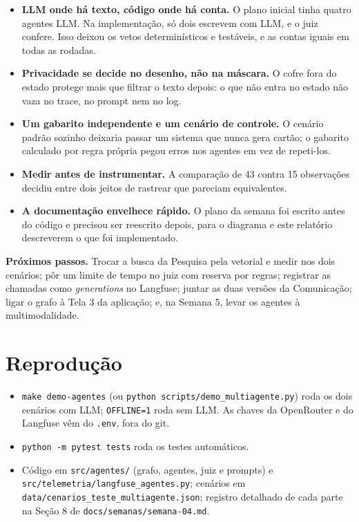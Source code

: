 \documentclass[12pt,a4paper]{article}
\begin{document}
\begin{itemize}
\item \textbf{LLM onde há texto, código onde há conta.} O plano inicial tinha quatro agentes LLM. Na implementação, só dois escrevem com LLM, e o juiz confere. Isso deixou os vetos determinísticos e testáveis, e as contas iguais em todas as rodadas.
\item \textbf{Privacidade se decide no desenho, não na máscara.} O cofre fora do estado protege mais que filtrar o texto depois: o que não entra no estado não vaza no trace, no prompt nem no log.
\item \textbf{Um gabarito independente e um cenário de controle.} O cenário padrão sozinho deixaria passar um sistema que nunca gera cartão; o gabarito calculado por regra própria pegou erros nos agentes em vez de repeti-los.
\item \textbf{Medir antes de instrumentar.} A comparação de 43 contra 15 observações decidiu entre dois jeitos de rastrear que pareciam equivalentes.
\item \textbf{A documentação envelhece rápido.} O plano da semana foi escrito antes do código e precisou ser reescrito depois, para o diagrama e este relatório descreverem o que foi implementado.
\end{itemize}

\textbf{Próximos passos.} Trocar a busca da Pesquisa pela vetorial e medir nos dois cenários; pôr um limite de tempo no juiz com reserva por regras; registrar as chamadas como \textit{generations} no Langfuse; juntar as duas versões da Comunicação; ligar o grafo à Tela 3 da aplicação; e, na Semana 5, levar os agentes à multimodalidade.


\section{Reprodução}
\begin{itemize}
\item \texttt{make demo-agentes} (ou \texttt{python scripts/demo\_\allowbreak{}multiagente.py}) roda os dois cenários com LLM; \texttt{OFFLINE=1} roda sem LLM. As chaves da OpenRouter e do Langfuse vêm do \texttt{.env}, fora do git.
\item \texttt{python -m pytest tests} roda os testes automáticos.
\item Código em \texttt{src/agentes/} (grafo, agentes, juiz e prompts) e \texttt{src/telemetria/langfuse\_\allowbreak{}agentes.py}; cenários em \texttt{data/cenarios\_\allowbreak{}teste\_\allowbreak{}multiagente.json}; registro detalhado de cada parte na Seção 8 de \texttt{docs/semanas/semana-04.md}.
\end{itemize}
\end{document}
